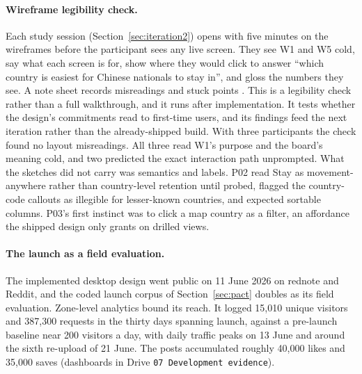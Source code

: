 \paragraph{Wireframe legibility check.} Each study session (Section~\ref{sec:iteration2}) opens with five minutes on the wireframes before the participant sees any live screen. They see W1 and W5 cold, say what each screen is for, show where they would click to answer ``which country is easiest for Chinese nationals to stay in'', and gloss the numbers they see. A note sheet records misreadings and stuck points \cite{nielsen1993usability}. This is a legibility check rather than a full walkthrough, and it runs after implementation. It tests whether the design's commitments read to first-time users, and its findings feed the next iteration rather than the already-shipped build. With three participants the check found no layout misreadings. All three read W1's purpose and the board's meaning cold, and two predicted the exact interaction path unprompted. What the sketches did not carry was semantics and labels. P02 read Stay as movement-anywhere rather than country-level retention until probed, flagged the country-code callouts as illegible for lesser-known countries, and expected sortable columns. P03's first instinct was to click a map country as a filter, an affordance the shipped design only grants on drilled views.

\paragraph{The launch as a field evaluation.} The implemented desktop design went public on 11 June 2026 on rednote and Reddit, and the coded launch corpus of Section~\ref{sec:pact} doubles as its field evaluation. Zone-level analytics bound its reach. It logged 15{,}010 unique visitors and 387{,}300 requests in the thirty days spanning launch, against a pre-launch baseline near 200 visitors a day, with daily traffic peaks on 13 June and around the sixth re-upload of 21 June. The posts accumulated roughly 40{,}000 likes and 35{,}000 saves (dashboards in Drive \texttt{07 Development evidence}).

